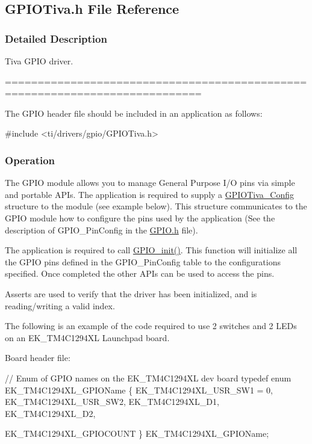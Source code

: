 \subsection{G\+P\+I\+O\+Tiva.\+h File Reference}
\label{_g_p_i_o_tiva_8h}


\subsubsection{Detailed Description}
Tiva G\+P\+I\+O driver. 

============================================================================

The G\+P\+I\+O header file should be included in an application as follows\+: 
\begin{DoxyCode}
\textcolor{preprocessor}{#include <ti/drivers/gpio/GPIOTiva.h>}
\end{DoxyCode}


\subsubsection*{Operation}

The G\+P\+I\+O module allows you to manage General Purpose I/\+O pins via simple and portable A\+P\+Is. The application is required to supply a \hyperlink{struct_g_p_i_o_tiva___config}{G\+P\+I\+O\+Tiva\+\_\+\+Config} structure to the module (see example below). This structure communicates to the G\+P\+I\+O module how to configure the pins used by the application (See the description of G\+P\+I\+O\+\_\+\+Pin\+Config in the \hyperlink{_g_p_i_o_8h}{G\+P\+I\+O.\+h} file).

The application is required to call \hyperlink{_g_p_i_o_8h_a7aaec489dca5ac4d278d2eb3ae38a2d2}{G\+P\+I\+O\+\_\+init()}. This function will initialize all the G\+P\+I\+O pins defined in the G\+P\+I\+O\+\_\+\+Pin\+Config table to the configurations specified. Once completed the other A\+P\+Is can be used to access the pins.

Asserts are used to verify that the driver has been initialized, and is reading/writing a valid index.

The following is an example of the code required to use 2 switches and 2 L\+E\+Ds on an E\+K\+\_\+\+T\+M4\+C1294\+X\+L Launchpad board.

Board header file\+: 
\begin{DoxyCode}
\textcolor{comment}{// Enum of GPIO names on the EK\_TM4C1294XL dev board}
\textcolor{keyword}{typedef} \textcolor{keyword}{enum} EK\_TM4C1294XL\_GPIOName \{
    EK\_TM4C1294XL\_USR\_SW1 = 0,
    EK\_TM4C1294XL\_USR\_SW2,
    EK\_TM4C1294XL\_D1,
    EK\_TM4C1294XL\_D2,

    EK\_TM4C1294XL\_GPIOCOUNT
\} EK\_TM4C1294XL\_GPIOName;
\end{DoxyCode}


